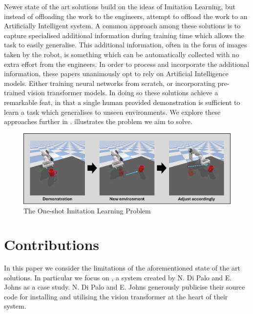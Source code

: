 Newer state of the art solutions \cite{coarse-to-fine, one-shot-pose-estimate, one-shot-imitation} build on the ideas of Imitation Learning, but instead of offloading the work to the engineers, attempt to offload the work to an Artificially Intelligent system. A common approach among these solutions is to capture specialised additional information during training time which allows the task to easily generalise. This additional information, often in the form of images taken by the robot, is something which can be automatically collected with no extra effort from the engineers. In order to process and incorporate the additional information, these papers unanimously opt to rely on Artificial Intelligence models. Either training neural networks from scratch, or incorporating pre-trained vision transformer models. In doing so these solutions achieve a remarkable feat, in that a single human provided demonstration is sufficient to learn a task which generalises to unseen environments. We explore these  approaches further in .  illustrates the problem we aim to solve.

\begin{figure}[h]
    \centering
    \includegraphics[width=\textwidth]{figures/intro.png}
    \caption{The One-shot Imitation Learning Problem}
    \label{fig:intro}
\end{figure}

\section{Contributions}
In this paper we consider the limitations of the aforementioned state of the art solutions. In particular we focus on , a system created by N. Di Palo and E. Johns \cite{one-shot-imitation} as a case study. N. Di Palo and E. Johns generously publicise their source code for installing and utilising the vision transformer at the heart of their system.\\


